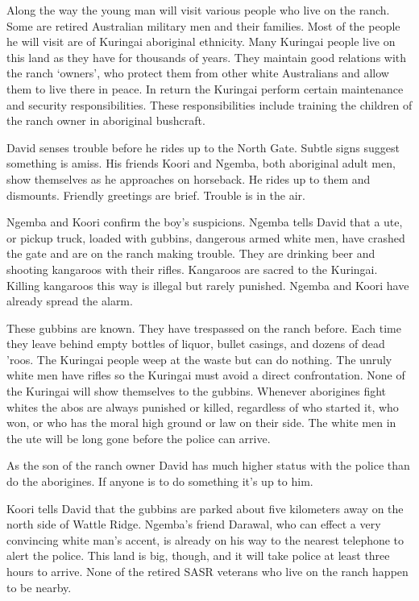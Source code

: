 Along the way the young man will visit various people who live on the ranch.  Some are retired Australian military men and their families.  Most of the people he will visit are of Kuringai aboriginal ethnicity. Many Kuringai people live on this land as they have for thousands of years.  They maintain good relations with the ranch `owners', who protect them from other white Australians and allow them to live there in peace. In return the Kuringai perform certain maintenance and security responsibilities. These responsibilities include training the children of the ranch owner in aboriginal bushcraft.

David senses trouble before he rides up to the North Gate.  Subtle signs suggest something is amiss.  His friends Koori and Ngemba, both aboriginal adult men, show themselves as he approaches on horseback.  He rides up to them and dismounts.  Friendly greetings are brief. Trouble is in the air.

Ngemba and Koori confirm the boy's suspicions. Ngemba tells David that a ute, or pickup truck, loaded with gubbins, dangerous armed white men, have crashed the gate and are on the ranch making trouble.  They are drinking beer and shooting kangaroos with their rifles. Kangaroos are sacred to the Kuringai.  Killing kangaroos this way is illegal but rarely punished. Ngemba and Koori have already spread the alarm.

These gubbins are known.  They have trespassed on the ranch before.  Each time they leave behind empty bottles of liquor, bullet casings, and dozens of dead 'roos.  The Kuringai people weep at the waste but can do nothing.  The unruly white men have rifles so the Kuringai must avoid a direct confrontation.  None of the Kuringai will show themselves to the gubbins.   Whenever aborigines fight whites the abos are always punished or killed, regardless of who started it, who won, or who has the moral high ground or law on their side.  The white men in the ute will be long gone before the police can arrive.

As the son of the ranch owner David has much higher status with the police than do the aborigines.  If anyone is to do something it's up to him.

Koori tells David that the gubbins are parked about five kilometers away on the north side of Wattle Ridge. Ngemba's friend Darawal, who can effect a very convincing white man's accent, is already on his way to the nearest telephone to alert the police.  This land is big, though, and it will take police at least three hours to arrive.  None of the retired SASR veterans who live on the ranch happen to be nearby.

